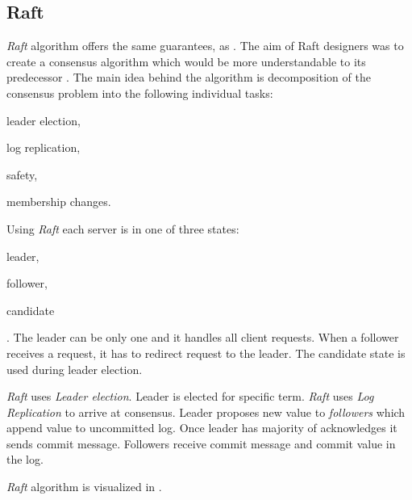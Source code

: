 


\subsection{Raft}
\emph{Raft} algorithm offers the same guarantees, as \paxos. 
The aim of Raft designers was to create a consensus algorithm which would be more understandable to its predecessor \cite{ongaro2014search}. 
The main idea behind the algorithm is decomposition of the consensus problem into the following individual tasks:
\begin{enumerate*}
\item leader election,
\item log replication,
\item safety,
\item membership changes.
\end{enumerate*} 
 Using \emph{Raft} each server is in one of three states: \begin{enumerate*} \item leader, \item follower, \item candidate \end{enumerate*}. The leader can be only one and it handles all client requests. When a follower receives a request, it has to redirect request to the leader. The candidate state is used during leader election. 


\emph{Raft} uses \emph{Leader election}. Leader is elected for specific term. \emph{Raft} uses \emph{Log Replication} to arrive at consensus. Leader proposes new value to \emph{followers} which append value to uncommitted log. Once leader has majority of acknowledges it sends commit message. Followers receive commit message and commit value in the log. 

\emph{Raft} algorithm is visualized in \cite{raftVisual}.

